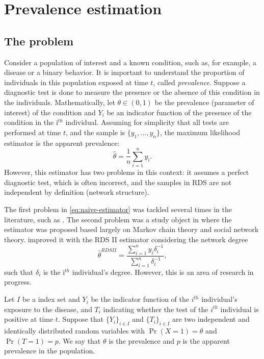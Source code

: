 

\chapter{Prevalence estimation}

\section{The problem}

Consider a population of interest and a known condition, such as, for example,
a disease or a binary behavior. It is important to understand the proportion
of individuals in this population exposed at time $t$, called {\em
prevalence}. Suppose a diagnostic test is done to measure the presence or the
absence of this condition in the individuals. Mathematically, let $\theta \in
(0,1)$ be the prevalence (parameter of interest) of the condition and $Y_i$ be an indicator function of the presence of the condition in the i$^{th}$ individual.
Assuming for simplicity that all tests are performed at time $t$, and the
sample is $\{y_1, ..., y_n\}$, the maximum likelihood estimator is the
apparent prevalence: 
\begin{equation}
    \label{eq:naive-estimator}
    \hat{\theta} = \frac{1}{n}\sum_{i=1}^n y_i.
\end{equation}
However, this estimator has two problems in this context: it assumes a perfect
diagnostic test, which is often incorrect, and the samples in RDS are not
independent by definition (network structure). 

The first problem in \eqref{eq:naive-estimator} was tackled several times in
the literature, such as \cite{mcinturff2004modelling}. The second problem was a study object in \cite{heckathorn1997,heckathorn2002} where the estimator was proposed
based largely on Markov chain theory and social network theory.
\cite{volz2008probability} improved it with the RDS II estimator considering
the network degree
\begin{equation}
    \hat{\theta}^{RDS II} = \frac{\sum_{i=1}^n y_i \delta_i^{-1}}{\sum_{i=1}^n \delta_i^{-1}},
\end{equation}
such that $\delta_i$ is the i$^{th}$ individual's degree. However, this is an
area of research in progress. 

Let $I$ be a index set and $Y_i$ be the indicator function of the $i^{th}$ individual's exposure to the disease, and $T_i$
indicating whether the test of the $i^{th}$ individual is positive at time
$t$. Suppose that $\{Y_i\}_{i \in I}$ and $\{T_i\}_{i \in I}$ are two independent and identically distributed
random variables with $\Pr(X = 1) = \theta$ and $\Pr(T = 1) = p$. We say that
$\theta$ is the prevalence and $p$ is the apparent prevalence in the
population. 


